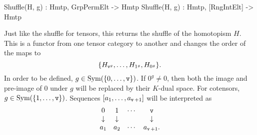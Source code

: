 \begin{intrinsics}
Shuffle(H, g) : Hmtp, GrpPermElt -> Hmtp
Shuffle(H, g) : Hmtp, [RngIntElt] -> Hmtp
\end{intrinsics}

Just like the shuffle for tensors, this returns the shuffle of the homotopism $H$.
This is a functor from one tensor category to another and changes the order of the maps to
\[ \{H_{\operatorname{\mathtt{v}}^g},\dots, H_{1^g}, H_{0^g}\}. \]
In order to be defined, $g\in\text{Sym}(\{0,\dots,\operatorname{\mathtt{v}} \})$. 
If $0^g\ne 0$, then both the image and pre-image of $0$ under $g$ will be replaced by their $K$-dual space.
For cotensors, $g\in\text{Sym}(\{1,\dots,\operatorname{\mathtt{v}}\})$.
Sequences $[a_1,\dots,a_{\operatorname{\mathtt{v}}+1}]$ will be interpreted as 
\[ \begin{array}{cccc} 0 & 1 & \cdots & \operatorname{\mathtt{v}} \\ \downarrow & \downarrow & & \downarrow \\ a_1 & a_2 & \cdots & a_{\operatorname{\mathtt{v}}+1}. \end{array}\]

